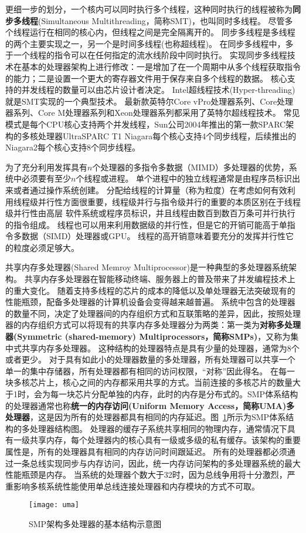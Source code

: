 更细一步的划分，一个核内可以同时执行多个线程，这种同时执行的线程被称为\textbf{同步多线程}(Simultaneous Multithreading，简称SMT)，也叫同时多线程。
尽管多个线程运行在相同的核心内，但线程之间是完全隔离开的。
同步多线程是多线程的两个主要实现之一，另一个是时间多线程(也称超线程)。
在同步多线程中，多于一个线程的指令可以在任何指定的流水线阶段中同时执行。
实现同步多线程技术在基本的处理器架构上进行修改：一是增加了在一个周期中从多个线程获取指令的能力；二是设置一个更大的寄存器文件用于保存来自多个线程的数据。
核心支持的并发线程的数量可以由芯片设计者决定。
Intel超线程技术(Hyper-threading)就是SMT实现的一个典型技术\cite{marr2002hyper}。
最新款英特尔Core vPro处理器系列\cite{samson2005interface}、Core处理器系列\cite{lempel20112nd}、Core M处理器系列和Xeon处理器系列\cite{chang200765}都采用了英特尔超线程技术。
常见模式是每个CPU核心支持两个并发线程，Sun公司2004年推出的第一款SPARC架构的多核处理器UltraSPARC T1 Niagara每个核心支持4个同步线程\cite{kongetira2005niagara}，后续推出的Niagara2每个核心支持8个同步线程。

为了充分利用发挥具有$n$个处理器的多指令多数据（MIMD）多处理器的优势，系统中必须要有至少$n$个线程或进程。
单个进程中的独立线程通常是由程序员标识出来或者通过操作系统创建。
分配给线程的计算量（称为粒度）在考虑如何有效利用线程级并行性方面很重要，线程级并行与指令级并行的重要的本质区别在于线程级并行性由高层 软件系统或程序员标识，并且线程由数百到数百万条可并行执行的指令组成。
线程也可以用来利用数据级的并行性，但是它的开销可能高于单指令多数据（SIMD）处理器或GPU\cite{shi2012vcuda}。
线程的高开销意味着要充分的发挥并行性它的粒度必须足够大。

共享内存多处理器(Shared Memroy Multiprocessor)是一种典型的多处理器系统架构。
共享内存多处理器在智能移动终端、服务器上的普及带来了并发编程技术上的重大变化。
随着支持多线程的芯片的成本的降低以及单处理器无法突破现有的性能瓶颈，配备多处理器的计算机设备会变得越来越普遍。
系统中包含的处理器的数量不同，决定了处理器间的内存组织方式和互联策略的差异，因此，按照处理器的内存组织方式可以将现有的共享内存多处理器分为两类：第一类为\textbf{对称多处理器(Symmetric (shared-memory) Multiprocessors，简称SMPs)}，又称为集中式共享内存多处理器。
	这种结构的处理器特点是具有少量的处理器，通常为8个或者更少。
	对于具有如此小的处理器数量的多处理器，所有处理器可以共享一个单一的集中存储器，所有处理器都有相同的访问权限，“对称”因此得名。
	在每一块多核芯片上，核心之间的内存都采用共享的方式。当前连接的多核芯片的数量大于1时，会为每一块芯片分配单独的内存，此时的内存是分布式的。SMP体系结构的处理器通常也称\textbf{统一的内存访问(Uniform Memory Access，简称UMA)多处理器}，这是因为所有的处理器都具有相同的内存延迟。图~\ref{fig:uma}所示为SMP体系结构的多处理器结构图。
	处理器的缓存子系统共享相同的物理内存，通常情况下具有一级共享内存，每个处理器内的核心具有一级或多级的私有缓存。该架构的重要属性是，所有的处理器具有相同的内存访问时间跟延迟。
	所有的处理器都必须通过一条总线实现同步与内存访问，因此，统一内存访问架构的多处理器系统的最大性能瓶颈是内存。
	当系统的处理器个数大于32时，因为总线争用将十分激烈，严重影响多核系统性能使用单总线连接处理器和内存模块的方式不可取。
\begin{figure}
\centering
\texttt{[image: uma]}
\caption{SMP架构多处理器的基本结构示意图}
\label{fig:uma}
\end{figure}
	
